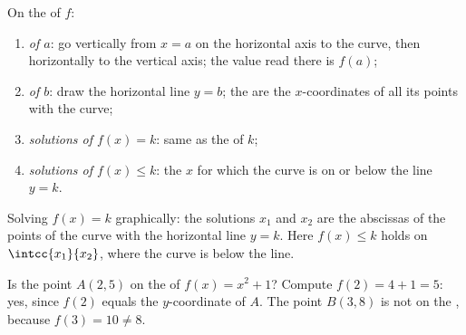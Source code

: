 \begin{method}\label{met:g10:functions:reading}
On the  of $f$:
\begin{enumerate}
  \item \emph{ of $a$}: go vertically from $x = a$ on the horizontal
        axis to the curve, then horizontally to the vertical axis; the
        value read there is $f(a)$;
  \item \emph{ of $b$}: draw the horizontal line $y = b$; the
         are the $x$-coordinates of all its  points
        with the curve;
  \item \emph{solutions of $f(x) = k$}: same as the  of $k$;
  \item \emph{solutions of $f(x) \leq k$}: the $x$ for which the curve is
        on or below the line $y = k$.
\end{enumerate}
\end{method}

\begin{omfigure}

{\small Solving $f(x) = k$ graphically: the solutions $x_1$ and $x_2$ are
the abscissas of the  points of the curve with the horizontal
line $y = k$. Here $f(x) \leq k$ holds on $\intcc{x_1}{x_2}$, where the
curve is below the line.}
\end{omfigure}

\begin{example}\label{ex:g10:functions:membership}
Is the point $A(2, 5)$ on the  of $f(x) = x^2 + 1$? Compute
$f(2) = 4 + 1 = 5$: yes, since $f(2)$ equals the $y$-coordinate of $A$.
The point $B(3, 8)$ is not on the , because $f(3) = 10 \neq 8$.
\end{example}

